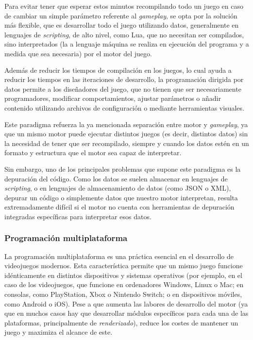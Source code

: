 \smallskip

Para evitar tener que esperar estos minutos recompilando todo un juego en caso de cambiar un simple parámetro referente al \textit{gameplay}, se opta por la solución más flexible, que es desarrollar todo el juego utilizando datos, generalmente en lenguajes de \textit{scripting}, de alto nivel, como Lua, que no necesitan ser compilados, sino interpretados (la  a lenguaje máquina se realiza en ejecución del programa y a medida que sea necesaria) por el motor del juego.

\medskip

Además de reducir los tiempos de compilación en los juegos, lo cual ayuda a reducir los tiempos en las iteraciones de desarrollo, la programación dirigida por datos permite a los diseñadores del juego, que no tienen que ser necesariamente programadores, modificar comportamientos, ajustar parámetros o añadir contenido utilizando archivos de configuración o mediante herramientas visuales.

\medskip

Este paradigma refuerza la ya mencionada separación entre motor y \textit{gameplay}, ya que un mismo motor puede ejecutar distintos juegos (es decir, distintos datos) sin la necesidad de tener que ser recompilado, siempre y cuando los datos estén en un formato y estructura que el motor sea capaz de interpretar.

\medskip

Sin embargo, uno de los principales problemas que supone este paradigma es la depuración del código. Como los datos se suelen almacenar en lenguajes de \textit{scripting}, o en lenguajes de almacenamiento de datos (como JSON o XML), depurar un código o simplemente datos que nuestro motor interpretan, resulta extremadamente difícil si el motor no cuenta con herramientas de depuración integradas específicas para interpretar esos datos.

\subsubsection{Programación multiplataforma}
\label{section:multiplataforma}
La programación multiplataforma es una práctica esencial en el desarrollo de videojuegos modernos. Esta característica permite que un mismo juego funcione idénticamente en distintos dispositivos y sistemas operativos (por ejemplo, en el caso de los videojuegos, que funcione en ordenadores Windows, Linux o Mac; en consolas, como PlayStation, Xbox o Nintendo Switch; o en dispositivos móviles, como Android o iOS). Pese a que aumenta las labores de desarrollo del motor (ya que en muchos casos hay que desarrollar módulos específicos para cada una de las plataformas, principalmente de \textit{renderizado}), reduce los costes de mantener un juego y maximiza el alcance de este.

